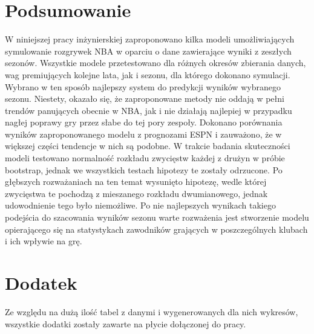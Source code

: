 \documentclass[inzynierska]{pwr_wmat_praca_dyplomowa}
\theoremstyle{plain}
\numberwithin{theorem}{chapter}
\theoremstyle{definition}
\numberwithin{theorem}{chapter}
\begin{document}
{\backmatter \chapter{Podsumowanie}}
W niniejszej pracy inżynierskiej zaproponowano kilka modeli umożliwiających symulowanie rozgrywek NBA w oparciu o dane zawierające wyniki z zeszłych sezonów. Wszystkie modele przetestowano dla różnych okresów zbierania danych, wag premiujących kolejne lata, jak i sezonu, dla którego dokonano symulacji. Wybrano w ten sposób najlepszy system do predykcji wyników wybranego sezonu. Niestety, okazało się, że zaproponowane metody nie oddają w pełni trendów panujących obecnie w NBA, jak i nie działają najlepiej w przypadku nagłej poprawy gry przez słabe do tej pory zespoły. Dokonano porównania wyników zaproponowanego modelu z prognozami ESPN i zauważono, że w większej części tendencje w nich są podobne. W trakcie badania skuteczności modeli testowano normalność rozkładu zwycięstw każdej z drużyn w próbie bootstrap, jednak we wszystkich testach hipotezy te zostały odrzucone. Po głębszych rozważaniach na ten temat wysunięto hipotezę, wedle której zwycięstwa te pochodzą z mieszanego rozkładu dwumianowego, jednak udowodnienie tego było niemożliwe. Po nie najlepszych wynikach takiego podejścia do szacowania wyników sezonu warte rozważenia jest stworzenie modelu opierającego się na statystykach zawodników grających w poszczególnych klubach i ich wpływie na grę.

{\backmatter \chapter{Dodatek}}
Ze względu na dużą ilość tabel z danymi i wygenerowanych dla nich wykresów, wszystkie dodatki zostały zawarte na płycie dołączonej do pracy.

\newpage
\end{document}
